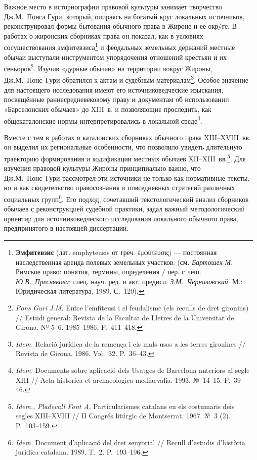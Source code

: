 Важное место в историографии правовой культуры занимает творчество Дж.М.~Понса Гури, который, опираясь на богатый круг локальных источников, реконструировал формы бытования обычного права в Жироне и её окрýге. В работах о жиронских сборниках права он показал, как в условиях сосуществования эмфитевзиса\footnote{\textbf{Эмфитевзис} (лат. emphyteusis от греч. {\unicodefallback ἐ}μφύτευσις) --- постоянная наследственная аренда полевых земельных участков. (см. \emph{Бартошек}\emph{ М.} Римское право: понятия, термины, определения / пер. с чеш. \emph{Ю.В.~Преснякова}; спец. науч. ред. и авт. предисл. \emph{З.М.~Черниловский}. М.: Юридическая литература, 1989. С.~120).} и феодальных земельных держаний местные обычаи выступали инструментом упорядочения отношений крестьян и их сеньоров\footnote{\emph{Pons}\emph{ }\emph{Guri}\emph{ }\emph{J}\emph{.}\emph{M}\emph{.} Entre l’emfiteusi i el feudalisme (els reculls de dret gironins) // Estudi general: Revista de la Facultat de Lletres de la Universitat de Girona. Nº 5--6. 1985--1986. P.~411--418.}. Изучив «дурные обычаи» на территории вокруг Жироны, Дж.М.~Понс~Гури обратился к актам и судебным материалам\footnote{\emph{Idem.} Relació jurídica de la remença i els mals usos a les terres gironines // Revista de Girona. 1986. Vol.~32. P.~36--43.}. Особое значение для настоящего исследования имеют его источниковедческие изыскания, посвящённые раннесредневековому праву и документам об использовании «Барселонских обычаев» до XIII~в. и позволяющие проследить, как общекаталонские нормы интерпретировались в локальной среде\footnote{\emph{Idem.} Documents sobre aplicació dels Usatges de Barcelona anteriors al segle XIII // Acta historica et archaeologica mediaevalia. 1993. №~14--15. P.~39--46.}.

Вместе с тем в работах о каталонских сборниках обычного права XIII--XVIII~вв. он выделил их региональные особенности, что позволило увидеть длительную траекторию формирования и кодификации местных обычаев XII--XIII~вв.\footnote{\emph{Idem., Pladevall Font A.} Particularismes catalans en els costumaris deis segles XIII--XVIII // II Congrés litúrgic de Montserrat. 1967. №~3 (2). P.~103--159.}. Для изучения правовой культуры Жироны принципиально важно, что Дж.М.~Понс~Гури рассмотрел эти источники не только как нормативные тексты, но и как свидетельство правосознания и повседневных стратегий различных социальных групп\footnote{\emph{Idem. }Document d’aplicació del dret senyorial // Recull d'estudis d'història jurídica catalana. 1989. T.~2. P.~193--196.}. Его подход, сочетавший текстологический анализ сборников обычаев с реконструкцией судебной практики, задал важный методологический ориентир для источниковедческого исследования локального обычного права, предпринятого в настоящей диссертации.

